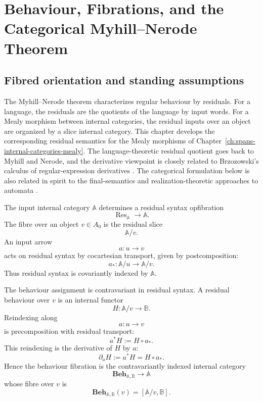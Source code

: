 \chapter{Behaviour, Fibrations, and the Categorical Myhill--Nerode Theorem}
\label{ch:behaviour-categories-myhill-nerode}

\section{Fibred orientation and standing assumptions}
\label{sec:behaviour-standing-assumptions}

The Myhill--Nerode theorem characterizes regular behaviour by residuals. For a language, the residuals are the quotients of the language by input words. For a Mealy morphism between internal categories, the residual inputs over an object are organized by a slice internal category. This chapter develops the corresponding residual semantics for the Mealy morphisms of Chapter~\ref{ch:spans-internal-categories-mealy}. The language-theoretic residual quotient goes back to Myhill and Nerode, and the derivative viewpoint is closely related to Brzozowski's calculus of regular-expression derivatives \cite{Myhill1957,Nerode1958,Brzozowski1964}. The categorical formulation below is also related in spirit to the final-semantics and realization-theoretic approaches to automata \cite{Goguen1973,Rutten1998,Rutten2000}.

The input internal category \(\mathbb A\) determines a residual syntax opfibration
\[
    \operatorname{Res}_{\mathbb A}\longrightarrow \mathbb A.
\]
The fibre over an object \(v\in A_0\) is the residual slice
\[
    \mathbb A/v.
\]
An input arrow
\[
    a:u\to v
\]
acts on residual syntax by cocartesian transport, given by postcomposition:
\[
    a_*:\mathbb A/u\to\mathbb A/v.
\]
Thus residual syntax is covariantly indexed by \(\mathbb A\).

The behaviour assignment is contravariant in residual syntax. A residual behaviour over \(v\) is an internal functor
\[
    H:\mathbb A/v\to\mathbb B.
\]
Reindexing along
\[
    a:u\to v
\]
is precomposition with residual transport:
\[
    a^*H:=H\circ a_*.
\]
This reindexing is the derivative of \(H\) by \(a\):
\[
    \partial_aH:=a^*H=H\circ a_*.
\]
Hence the behaviour fibration is the contravariantly indexed internal category
\[
    \mathbf{Beh}_{\mathbb A,\mathbb B}\longrightarrow \mathbb A
\]
whose fibre over \(v\) is
\[
    \mathbf{Beh}_{\mathbb A,\mathbb B}(v)
    =
    [\mathbb A/v,\mathbb B].
\]

